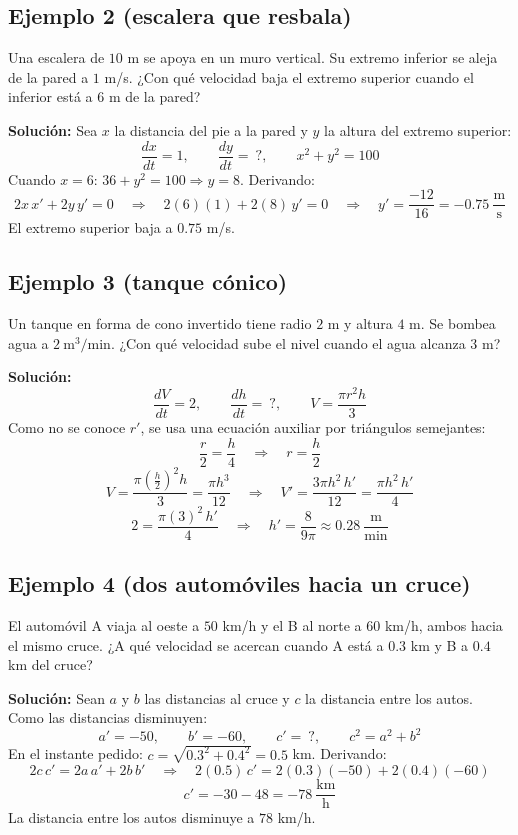 \documentclass[12pt]{article}
\begin{document}
\subsection{Ejemplo 2 (escalera que resbala)}
Una escalera de $10$ m se apoya en un muro vertical. Su extremo inferior se aleja de la pared a $1$ m/s. ¿Con qué velocidad baja el extremo superior cuando el inferior está a $6$ m de la pared?

\textbf{Solución:} Sea $x$ la distancia del pie a la pared y $y$ la altura del extremo superior:
\[
\frac{dx}{dt} = 1, \qquad \frac{dy}{dt} = \ ?, \qquad x^2 + y^2 = 100
\]
Cuando $x = 6$: $36 + y^2 = 100 \Rightarrow y = 8$. Derivando:
\[
2x\,x' + 2y\,y' = 0 \quad \Rightarrow \quad 2(6)(1) + 2(8)\,y' = 0 \quad \Rightarrow \quad y' = \frac{-12}{16} = -0.75\ \frac{\text{m}}{\text{s}}
\]
El extremo superior baja a $0.75$ m/s.

\subsection{Ejemplo 3 (tanque cónico)}
Un tanque en forma de cono invertido tiene radio $2$ m y altura $4$ m. Se bombea agua a $2\ \text{m}^3/\text{min}$. ¿Con qué velocidad sube el nivel cuando el agua alcanza $3$ m?

\textbf{Solución:}
\[
\frac{dV}{dt} = 2, \qquad \frac{dh}{dt} = \ ?, \qquad V = \frac{\pi r^2 h}{3}
\]
Como no se conoce $r'$, se usa una ecuación auxiliar por triángulos semejantes:
\[
\frac{r}{2} = \frac{h}{4} \quad \Rightarrow \quad r = \frac{h}{2}
\]
\[
V = \frac{\pi \left(\frac{h}{2}\right)^2 h}{3} = \frac{\pi h^3}{12} \quad \Rightarrow \quad V' = \frac{3\pi h^2 \, h'}{12} = \frac{\pi h^2 \, h'}{4}
\]
\[
2 = \frac{\pi (3)^2 \, h'}{4} \quad \Rightarrow \quad h' = \frac{8}{9\pi} \approx 0.28\ \frac{\text{m}}{\text{min}}
\]

\subsection{Ejemplo 4 (dos automóviles hacia un cruce)}
El automóvil A viaja al oeste a $50$ km/h y el B al norte a $60$ km/h, ambos hacia el mismo cruce. ¿A qué velocidad se acercan cuando A está a $0.3$ km y B a $0.4$ km del cruce?

\textbf{Solución:} Sean $a$ y $b$ las distancias al cruce y $c$ la distancia entre los autos. Como las distancias disminuyen:
\[
a' = -50, \qquad b' = -60, \qquad c' = \ ?, \qquad c^2 = a^2 + b^2
\]
En el instante pedido: $c = \sqrt{0.3^2 + 0.4^2} = 0.5$ km. Derivando:
\[
2c\,c' = 2a\,a' + 2b\,b' \quad \Rightarrow \quad 2(0.5)\,c' = 2(0.3)(-50) + 2(0.4)(-60)
\]
\[
c' = -30 - 48 = -78\ \frac{\text{km}}{\text{h}}
\]
La distancia entre los autos disminuye a $78$ km/h.
\end{document}
